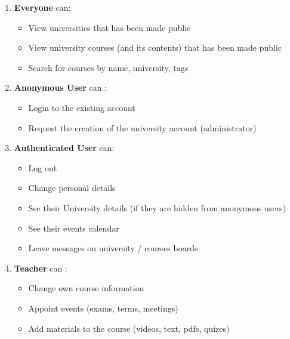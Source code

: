 \documentclass[a4paper,11pt,twoside]{report}
\theoremstyle{definition}
\begin{document}
\begin{enumerate}
	\itemsep0em 
    \item \textbf{Everyone} can: 
    \begin{itemize}
        \vspace{-0.2cm}\item View universities that has been made public
        \vspace{-0.2cm}\item View university courses (and its contents) that has been made public
        \vspace{-0.2cm}\item Search for courses by name, university, tags
    \end{itemize}
    
    \item \textbf{Anonymous User} can :
    \begin{itemize} \itemsep0em 
        \vspace{-0.2cm}\item Login to the existing account
        \vspace{-0.2cm}\item Request the creation of the university account (administrator)
    \end{itemize}
    
    \item \textbf{Authenticated User} can:
     \begin{itemize} \itemsep0em 
      \vspace{-0.2cm}\item Log out
      \vspace{-0.2cm}\item Change personal details
      \vspace{-0.2cm}\item See their University details (if they are hidden from anonymous users)
      \vspace{-0.2cm}\item See their events calendar
      \vspace{-0.2cm}\item Leave messages on university / courses boards
    \end{itemize}

    \item \textbf{Teacher} can :
     \begin{itemize} \itemsep0em 
      \vspace{-0.2cm}\item Change own course information
      \vspace{-0.2cm}\item Appoint events (exams, terms, meetings)
      \vspace{-0.2cm}\item Add materials to the course (videos, text, pdfs, quizes)
    \end{itemize}
    

\end{enumerate}
\end{document}
